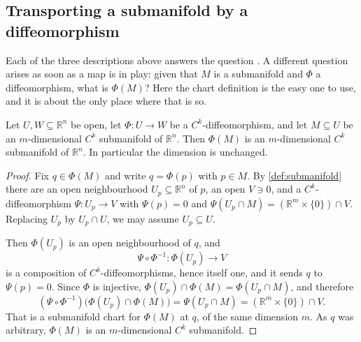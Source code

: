 \subsection{Transporting a submanifold by a diffeomorphism}

Each of the three descriptions above answers the question . A different question arises as soon as a map is in play: given that $M$ is a
submanifold and $\Phi$ a diffeomorphism, what is $\Phi(M)$? Here the chart definition is the easy
one to use, and it is about the only place where that is so.

\begin{proposition}
\label{prop:diffeomorphism_preserves_submanifold}
Let $U, W \subseteq \mathbb{R}^n$ be open, let $\Phi : U \to W$ be a $C^k$-diffeomorphism, and let
$M \subseteq U$ be an $m$-dimensional $C^k$ submanifold of $\mathbb{R}^n$. Then $\Phi(M)$ is an
$m$-dimensional $C^k$ submanifold of $\mathbb{R}^n$. In particular the dimension is unchanged.
\end{proposition}

\begin{proof}
Fix $q \in \Phi(M)$ and write $q = \Phi(p)$ with $p \in M$. By \cref{def:submanifold} there are an
open neighbourhood $U_p \subseteq \mathbb{R}^n$ of $p$, an open $V \ni 0$, and a
$C^k$-diffeomorphism $\Psi : U_p \to V$ with $\Psi(p) = 0$ and
$\Psi(U_p \cap M) = (\mathbb{R}^m\times\{0\}) \cap V$. Replacing $U_p$ by $U_p \cap U$, we may
assume $U_p \subseteq U$.

Then $\Phi(U_p)$ is an open neighbourhood of $q$, and
\[\Psi \circ \Phi^{-1} : \Phi(U_p) \longrightarrow V\]
is a composition of $C^k$-diffeomorphisms, hence itself one, and it sends $q$ to $\Psi(p) = 0$.
Since $\Phi$ is injective, $\Phi(U_p) \cap \Phi(M) = \Phi(U_p \cap M)$, and therefore
\[(\Psi\circ\Phi^{-1})\big(\Phi(U_p) \cap \Phi(M)\big) = \Psi(U_p \cap M)
  = (\mathbb{R}^m\times\{0\}) \cap V .\]
That is a submanifold chart for $\Phi(M)$ at $q$, of the same dimension $m$. As $q$ was arbitrary,
$\Phi(M)$ is an $m$-dimensional $C^k$ submanifold.
\end{proof}


